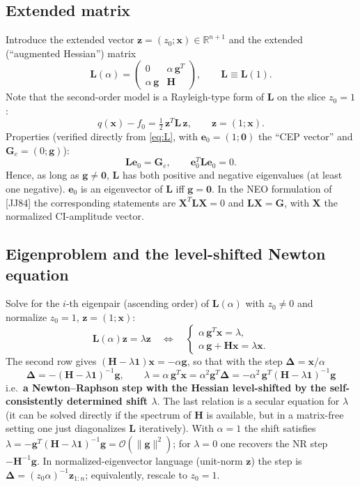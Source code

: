 \documentclass[11pt,a4paper]{article}
\newcommand{\bH}{\mathbf{H}}
\newcommand{\bL}{\mathbf{L}}
\newcommand{\bg}{\mathbf{g}}
\newcommand{\bx}{\mathbf{x}}
\newcommand{\bz}{\mathbf{z}}
\newcommand{\be}{\mathbf{e}}
\newcommand{\bd}{\boldsymbol{\Delta}}
\newcommand{\bG}{\mathbf{G}}
\newcommand{\bX}{\mathbf{X}}
\newcommand{\bone}{\mathbf{1}}
\begin{document}
\subsection{Extended matrix}
Introduce the extended vector $\bz=(z_0;\bx)\in\mathbb R^{n+1}$ and the extended (``augmented Hessian'') matrix
\begin{equation}
 \bL(\alpha)=\begin{pmatrix}0&\alpha\,\bg^T\\ \alpha\,\bg&\bH\end{pmatrix},\qquad
 \bL\equiv\bL(1).\label{eq:L}
\end{equation}
Note that the second-order model is a Rayleigh-type form of $\bL$ on the slice $z_0=1$:
\begin{equation}
 q(\bx)-f_0=\tfrac12\,\bz^T\bL\,\bz,\qquad \bz=(1;\bx).
\end{equation}
Properties (verified directly from \eqref{eq:L}, with $\be_0=(1;\mathbf 0)$ the ``CEP vector'' and $\bG_e=(0;\bg)$):
\begin{equation}
 \bL\be_0=\bG_e,\qquad \be_0^T\bL\be_0=0 .\label{eq:Lprops}
\end{equation}
Hence, as long as $\bg\neq\mathbf 0$, $\bL$ has both positive and negative eigenvalues (at least one negative). $\be_0$ is an eigenvector of $\bL$ iff $\bg=\mathbf 0$.
In the NEO formulation of [JJ84] the corresponding statements are $\bX^T\bL\bX=0$ and $\bL\bX=\bG$, with $\bX$ the normalized CI-amplitude vector.

\subsection{Eigenproblem and the level-shifted Newton equation}
Solve for the $i$-th eigenpair (ascending order) of $\bL(\alpha)$ with $z_0\neq0$ and normalize $z_0=1$, $\bz=(1;\bx)$:
\begin{equation}
 \bL(\alpha)\bz=\lambda\bz\quad\Longleftrightarrow\quad
 \begin{cases}\alpha\,\bg^T\bx=\lambda,\\[2pt] \alpha\,\bg+\bH\bx=\lambda\bx.\end{cases}\label{eq:eigsys}
\end{equation}
The second row gives $(\bH-\lambda\bone)\bx=-\alpha\bg$, so that with the step $\bd=\bx/\alpha$
\begin{equation}
 \boxed{\ \bd=-(\bH-\lambda\bone)^{-1}\bg,\qquad \lambda=\alpha\,\bg^T\bx=\alpha^2\bg^T\bd=-\alpha^2\,\bg^T(\bH-\lambda\bone)^{-1}\bg\ }\label{eq:neostep}
\end{equation}
i.e.\ \textbf{a Newton--Raphson step with the Hessian level-shifted by the self-consistently determined shift $\lambda$}.
The last relation is a secular equation for $\lambda$ (it can be solved directly if the spectrum of $\bH$ is available, but in a matrix-free setting one just diagonalizes $\bL$ iteratively).
With $\alpha=1$ the shift satisfies $\lambda=-\bg^T(\bH-\lambda\bone)^{-1}\bg=\mathcal O(\|\bg\|^2)$; for $\lambda=0$ one recovers the NR step $-\bH^{-1}\bg$. In normalized-eigenvector language (unit-norm $\bz$) the step is $\bd=(z_0\alpha)^{-1}\bz_{1:n}$; equivalently, rescale to $z_0=1$.
\end{document}
